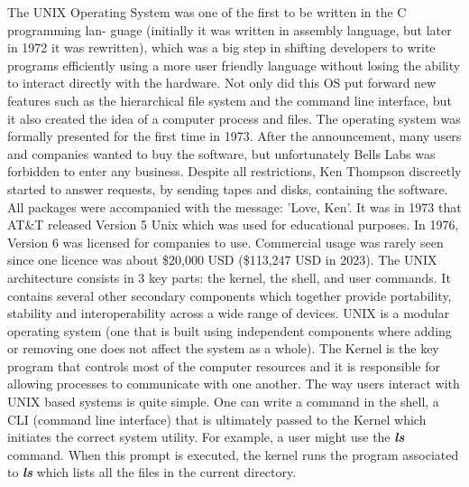 \documentclass[12pt]{article}
\begin{document}
The UNIX Operating System was one of the first to be written in the C programming lan- guage (initially it was written in assembly language, but later in 1972 it was rewritten), which was a big step in shifting developers to write programs efficiently using a more user friendly language without losing the ability to interact directly with the hardware. Not only did this OS put forward new features such as the hierarchical file system and the command line interface, but it also created the idea of a computer process and files. The operating system was formally presented for the first time in 1973. After the announcement, many users and companies wanted to buy the software, but unfortunately Bells Labs was forbidden to enter any business. Despite all restrictions, Ken Thompson discreetly started to answer requests, by sending tapes and disks, containing the software. All packages were accompanied with the message: ’Love, Ken’. It was in 1973 that AT\&T released Version 5 Unix which was used for educational purposes. In 1976, Version 6 was licensed for companies to use. Commercial usage was rarely seen since one licence was about \$20,000 USD (\$113,247 USD in 2023).\newline\newline
The UNIX architecture consists in 3 key parts: the kernel, the shell, and user commands. It contains several other secondary components which together provide portability, stability and interoperability across a wide range of devices. UNIX is a modular operating system (one that is built using independent components where adding or removing one does not affect the system as a whole). The Kernel is the key program that controls most of the computer resources and it is responsible for allowing processes to communicate with one another. The way users interact with UNIX based systems is quite simple. One can write a command in the shell, a CLI (command line interface) that is ultimately passed to the Kernel which initiates the correct system utility. For example, a user might use the \textit{\textbf{ls}} command. When this prompt is executed, the kernel runs the program associated to \textit{\textbf{ls}} which lists all the files in the current directory.\newline\newline
\end{document}
